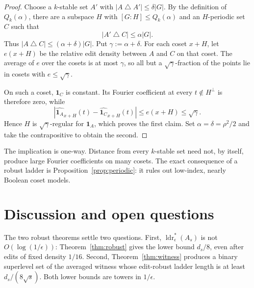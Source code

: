 \documentclass[11pt]{article}
\theoremstyle{plain}
\theoremstyle{definition}
\numberwithin{theorem}{section}
\newcommand{\abs}[1]{\lvert #1\rvert}
\newcommand{\ldrs}{\operatorname{ldr}^{*}}
\begin{document}
\begin{proof}
Choose a $k$-stable set $A'$ with
$\abs{A\mathbin\triangle A'}\le\delta\abs G$.  By the definition of
$Q_k(\alpha)$, there are a subspace $H$ with $[G:H]\le Q_k(\alpha)$ and an
$H$-periodic set $C$ such that
\[
  \abs{A'\mathbin\triangle C}\le\alpha\abs G.
\]
Thus $\abs{A\mathbin\triangle C}\le(\alpha+\delta)\abs G$.  Put
$\gamma:=\alpha+\delta$.  For each coset $x+H$, let $e(x+H)$ be the relative
edit density between $A$ and $C$ on that coset.  The average of $e$ over the
cosets is at most $\gamma$, so all but a $\sqrt\gamma$-fraction of the points
lie in cosets with $e\le\sqrt\gamma$.

On such a coset, $\mathbf1_C$ is constant.  Its Fourier coefficient at every
$t\notin H^\perp$ is therefore zero, while
\[
  \left|\widehat{\mathbf1_A}_{x+H}(t)
        -\widehat{\mathbf1_C}_{x+H}(t)\right|
  \le e(x+H)\le\sqrt\gamma.
\]
Hence $H$ is $\sqrt\gamma$-regular for $\mathbf1_A$, which proves the first
claim.  Set $\alpha=\delta=\rho^2/2$ and take the contrapositive to obtain the
second.
\end{proof}

The implication is one-way.  Distance from every $k$-stable set need not, by
itself, produce large Fourier coefficients on many cosets.  The exact
consequence of a robust ladder is Proposition~\ref{prop:periodic}: it rules
out low-index, nearly Boolean coset models.

\section{Discussion and open questions}\label{sec:remarks}

The two robust theorems settle two questions.  First,
$\ldrs_\epsilon(A_s)$ is not $O(\log(1/\epsilon))$:
Theorem~\ref{thm:robust} gives the lower bound $d_s/8$, even after edits of
fixed density $1/16$.  Second, Theorem~\ref{thm:witness} produces a binary
superlevel set of the averaged witness whose edit-robust ladder length is at
least $d_s/(8\sqrt{s})$.  Both lower bounds are towers in $1/\epsilon$.
\end{document}

